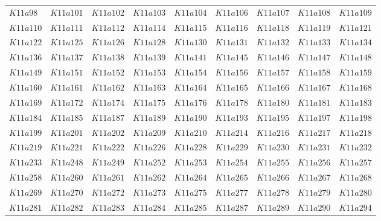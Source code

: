 \documentclass{amsart} %
\theoremstyle{thm}
\theoremstyle{definition}
\numberwithin{equation}{section}
\begin{document}
{\begin{longtable}{@{}lllllllll@{}}
  $K11a98$ &  
  $K11a101$ &  
  $K11a102$ &  
  $K11a103$ &  
  $K11a104$ &  
  $K11a106$ &  
  $K11a107$ &  
  $K11a108$ &  
  $K11a109$ \\   
  $K11a110$ &  
  $K11a111$ &  
  $K11a112$ &  
  $K11a114$ &  
  $K11a115$ &  
  $K11a116$ &  
  $K11a118$ &  
  $K11a119$ &  
  $K11a121$ \\   
  $K11a122$ &  
  $K11a125$ &  
  $K11a126$ &  
  $K11a128$ &  
  $K11a130$ &  
  $K11a131$ &  
  $K11a132$ &  
  $K11a133$ &  
  $K11a134$ \\   
  $K11a136$ &  
  $K11a137$ &  
  $K11a138$ &  
  $K11a139$ &  
  $K11a141$ &  
  $K11a145$ &  
  $K11a146$ &  
  $K11a147$ &  
  $K11a148$ \\   
  $K11a149$ &  
  $K11a151$ &  
  $K11a152$ &  
  $K11a153$ &  
  $K11a154$ &  
  $K11a156$ &  
  $K11a157$ &  
  $K11a158$ &  
  $K11a159$ \\   
  $K11a160$ &  
  $K11a161$ &  
  $K11a162$ &  
  $K11a163$ &  
  $K11a164$ &  
  $K11a165$ &  
  $K11a166$ &  
  $K11a167$ &  
  $K11a168$ \\   
  $K11a169$ &  
  $K11a172$ &  
  $K11a174$ &  
  $K11a175$ &  
  $K11a176$ &  
  $K11a178$ &  
  $K11a180$ &  
  $K11a181$ &  
  $K11a183$ \\   
  $K11a184$ &  
  $K11a185$ &  
  $K11a187$ &  
  $K11a189$ &  
  $K11a190$ &  
  $K11a193$ &  
  $K11a195$ &  
  $K11a197$ &  
  $K11a198$ \\   
  $K11a199$ &  
  $K11a201$ &  
  $K11a202$ &  
  $K11a209$ &  
  $K11a210$ &  
  $K11a214$ &  
  $K11a216$ &  
  $K11a217$ &  
  $K11a218$ \\   
  $K11a219$ &  
  $K11a221$ &  
  $K11a222$ &  
  $K11a226$ &  
  $K11a228$ &  
  $K11a229$ &  
  $K11a230$ &  
  $K11a231$ &  
  $K11a232$ \\   
  $K11a233$ &  
  $K11a248$ &  
  $K11a249$ &  
  $K11a252$ &  
  $K11a253$ &  
  $K11a254$ &  
  $K11a255$ &  
  $K11a256$ &  
  $K11a257$ \\   
  $K11a258$ &  
  $K11a260$ &  
  $K11a261$ &  
  $K11a262$ &  
  $K11a264$ &  
  $K11a265$ &  
  $K11a266$ &  
  $K11a267$ &  
  $K11a268$ \\   
  $K11a269$ &  
  $K11a270$ &  
  $K11a272$ &  
  $K11a273$ &  
  $K11a275$ &  
  $K11a277$ &  
  $K11a278$ &  
  $K11a279$ &  
  $K11a280$ \\   
  $K11a281$ &  
  $K11a282$ &  
  $K11a283$ &  
  $K11a284$ &  
  $K11a285$ &  
  $K11a287$ &  
  $K11a289$ &  
  $K11a290$ &  
  $K11a294$ \\   

\end{longtable}}
\end{document}
